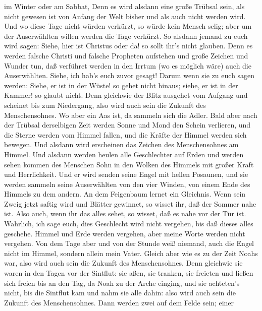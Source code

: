 im Winter oder am Sabbat,  Denn es wird alsdann eine große
Trübsal sein, als nicht gewesen ist von Anfang der Welt bisher und als
auch nicht werden wird.  Und wo diese Tage nicht würden
verkürzt, so würde kein Mensch selig; aber um der Auserwählten willen
werden die Tage verkürzt.  So alsdann jemand zu euch wird
sagen: Siehe, hier ist Christus oder da! so sollt ihr's nicht glauben.
 Denn es werden falsche Christi und falsche Propheten
aufstehen und große Zeichen und Wunder tun, daß verführet werden in den
Irrtum (wo es möglich wäre) auch die Auserwählten.  Siehe,
ich hab's euch zuvor gesagt!  Darum wenn sie zu euch sagen
werden: Siehe, er ist in der Wüste! so gehet nicht hinaus; siehe, er ist
in der Kammer! so glaubt nicht.  Denn gleichwie der Blitz
ausgehet vom Aufgang und scheinet bis zum Niedergang, also wird auch
sein die Zukunft des Menschensohnes.  Wo aber ein Aas ist,
da sammeln sich die Adler.  Bald aber nach der Trübsal
derselbigen Zeit werden Sonne und Mond den Schein verlieren, und die
Sterne werden vom Himmel fallen, und die Kräfte der Himmel werden sich
bewegen.  Und alsdann wird erscheinen das Zeichen des
Menschensohnes am Himmel. Und alsdann werden heulen alle Geschlechter
auf Erden und werden sehen kommen des Menschen Sohn in den Wolken des
Himmels mit großer Kraft und Herrlichkeit.  Und er wird
senden seine Engel mit hellen Posaunen, und sie werden sammeln seine
Auserwählten von den vier Winden, von einem Ende des Himmels zu dem
andern.  An dem Feigenbaum lernet ein Gleichnis. Wenn sein
Zweig jetzt saftig wird und Blätter gewinnet, so wisset ihr, daß der
Sommer nahe ist.  Also auch, wenn ihr das alles sehet, so
wisset, daß es nahe vor der Tür ist.  Wahrlich, ich sage
euch, dies Geschlecht wird nicht vergehen, bis daß dieses alles
geschehe.  Himmel und Erde werden vergehen, aber meine
Worte werden nicht vergehen.  Von dem Tage aber und von der
Stunde weiß niemand, auch die Engel nicht im Himmel, sondern allein mein
Vater.  Gleich aber wie es zu der Zeit Noahs war, also wird
auch sein die Zukunft des Menschensohnes.  Denn gleichwie
sie waren in den Tagen vor der Sintflut: sie aßen, sie tranken, sie
freieten und ließen sich freien bis an den Tag, da Noah zu der Arche
einging,  und sie achteten's nicht, bis die Sintflut kam
und nahm sie alle dahin: also wird auch sein die Zukunft des
Menschensohnes.  Dann werden zwei auf dem Felde sein; einer
